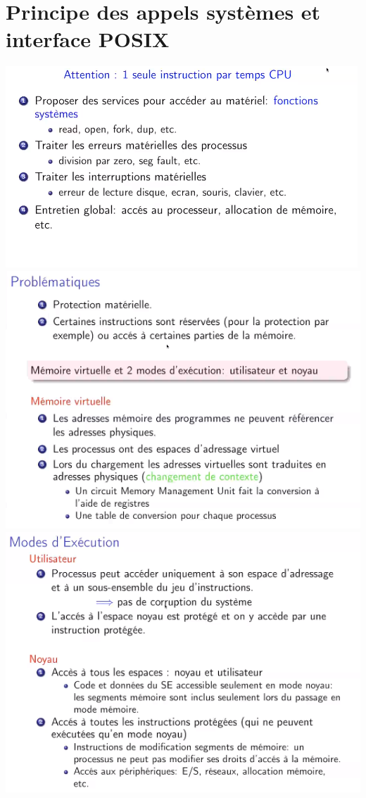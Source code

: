 \documentclass{article}
\begin{document}
    \section{Principe des appels systèmes et interface POSIX}
    \includegraphics{6.PNG}
    \includegraphics{7.PNG}
    \includegraphics{8.PNG}
\end{document}
